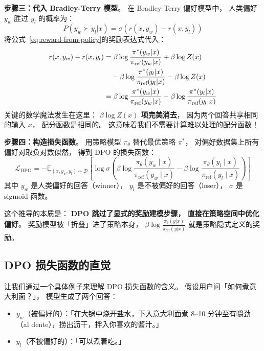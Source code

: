 \textbf{步骤三：代入 Bradley-Terry 模型}。
在 Bradley-Terry 偏好模型中，
人类偏好 $y_w$ 胜过 $y_l$ 的概率为：
\begin{equation}
  P(y_w \succ y_l | x) = \sigma\!\left(r(x, y_w) - r(x, y_l)\right)
\end{equation}
将公式~\eqref{eq:reward-from-policy}的奖励表达式代入：
\begin{align}
  r(x, y_w) - r(x, y_l)
  &= \beta \log \frac{\pi^*(y_w|x)}{\pi_{\text{ref}}(y_w|x)} + \beta \log Z(x) \notag \\
  &\quad - \beta \log \frac{\pi^*(y_l|x)}{\pi_{\text{ref}}(y_l|x)} - \beta \log Z(x) \notag \\
  &= \beta \log \frac{\pi^*(y_w|x)}{\pi_{\text{ref}}(y_w|x)}
     - \beta \log \frac{\pi^*(y_l|x)}{\pi_{\text{ref}}(y_l|x)}
\end{align}
关键的数学魔法发生在这里：
\textbf{$\beta \log Z(x)$ 项完美消去}，
因为两个回答共享相同的输入 $x$，
配分函数是相同的。
这意味着我们不需要计算难以处理的配分函数！

\textbf{步骤四：构造损失函数}。
用策略模型 $\pi_\theta$ 替代最优策略 $\pi^*$，
对偏好数据集上所有偏好对取负对数似然，
得到 DPO 的损失函数：
\begin{equation}
  \mathcal{L}_{\mathrm{DPO}} = -\mathbb{E}_{(x, y_w, y_l) \sim \mathcal{D}}\!\left[
    \log \sigma\!\left(
    \beta \log \frac{\pi_\theta(y_w \mid x)}{\pi_{\mathrm{ref}}(y_w \mid x)}
    - \beta \log \frac{\pi_\theta(y_l \mid x)}{\pi_{\mathrm{ref}}(y_l \mid x)}
  \right)\right]
  \label{eq:dpo}
\end{equation}
其中 $y_w$ 是人类偏好的回答（winner），
$y_l$ 是不被偏好的回答（loser），
$\sigma$ 是 sigmoid 函数。

这个推导的本质是：
\textbf{DPO 跳过了显式的奖励建模步骤，
直接在策略空间中优化偏好}。
奖励模型被「折叠」进了策略本身，
$\beta \log \frac{\pi_\theta(y|x)}{\pi_{\text{ref}}(y|x)}$
就是策略隐式定义的奖励。

\subsection{DPO 损失函数的直觉}

让我们通过一个具体例子来理解 DPO 损失函数的含义。
假设用户问「如何煮意大利面？」，
模型生成了两个回答：
\begin{itemize}[noitemsep]
  \item $y_w$（被偏好的）：「在大锅中烧开盐水，下入意大利面煮 8--10 分钟至有嚼劲（al dente），捞出沥干，拌入你喜欢的酱汁。」
  \item $y_l$（不被偏好的）：「可以煮着吃。」
\end{itemize}

